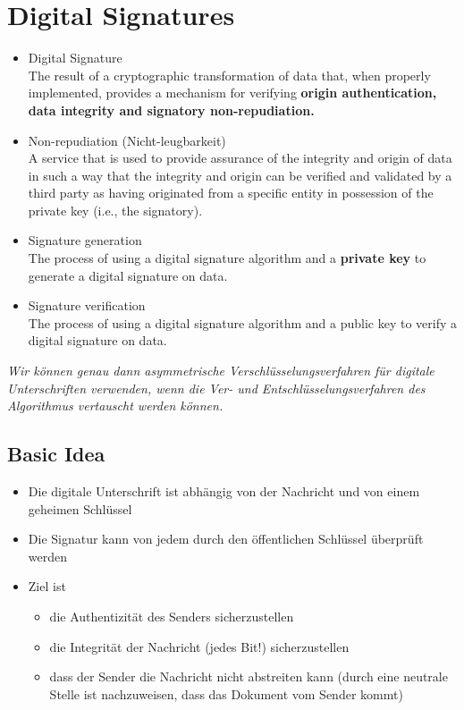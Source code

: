 \hypertarget{digital-signatures}{%
\section{Digital Signatures}\label{digital-signatures}}

\begin{itemize}
\tightlist
\item
  Digital Signature\\
  The result of a cryptographic transformation of data that, when
  properly implemented, provides a mechanism for verifying
  \textbf{origin authentication, data integrity and signatory
  non-repudiation.}
\item
  Non-repudiation (Nicht-leugbarkeit)\\
  A service that is used to provide assurance of the integrity and
  origin of data in such a way that the integrity and origin can be
  verified and validated by a third party as having originated from a
  specific entity in possession of the private key (i.e., the
  signatory).
\item
  Signature generation\\
  The process of using a digital signature algorithm and a
  \textbf{private key} to generate a digital signature on data.
\item
  Signature verification\\
  The process of using a digital signature algorithm and a public key to
  verify a digital signature on data.
\end{itemize}

\emph{Wir können genau dann asymmetrische Verschlüsselungsverfahren für
digitale Unterschriften verwenden, wenn die Ver- und
Entschlüsselungsverfahren des Algorithmus vertauscht werden können.}

\hypertarget{basic-idea}{%
\subsection{Basic Idea}\label{basic-idea}}

\begin{itemize}
\tightlist
\item
  Die digitale Unterschrift ist abhängig von der Nachricht und von einem
  geheimen Schlüssel
\item
  Die Signatur kann von jedem durch den öffentlichen Schlüssel überprüft
  werden
\item
  Ziel ist

  \begin{itemize}
  \tightlist
  \item
    die Authentizität des Senders sicherzustellen
  \item
    die Integrität der Nachricht (jedes Bit!) sicherzustellen
  \item
    dass der Sender die Nachricht nicht abstreiten kann (durch eine
    neutrale Stelle ist nachzuweisen, dass das Dokument vom Sender
    kommt)
  \end{itemize}
\end{itemize}


